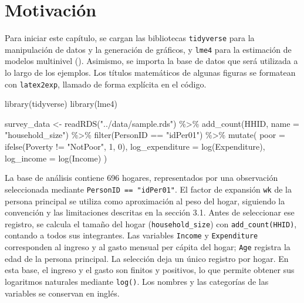 \documentclass[
  spanish,
  11pt,
  letterpaper,
  oneside,
  open=any]{scrbook}
\newenvironment{Shaded}{\begin{snugshade}}{\end{snugshade}}
\newcommand{\AttributeTok}[1]{\textcolor[rgb]{0.40,0.45,0.13}{#1}}
\newcommand{\DecValTok}[1]{\textcolor[rgb]{0.68,0.00,0.00}{#1}}
\newcommand{\FunctionTok}[1]{\textcolor[rgb]{0.28,0.35,0.67}{#1}}
\newcommand{\NormalTok}[1]{\textcolor[rgb]{0.00,0.23,0.31}{#1}}
\newcommand{\OtherTok}[1]{\textcolor[rgb]{0.00,0.23,0.31}{#1}}
\newcommand{\SpecialCharTok}[1]{\textcolor[rgb]{0.37,0.37,0.37}{#1}}
\newcommand{\StringTok}[1]{\textcolor[rgb]{0.13,0.47,0.30}{#1}}
\begin{document}
\section{Motivación}\label{sec-motivacionMult}

Para iniciar este capítulo, se cargan las bibliotecas \texttt{tidyverse}
para la manipulación de datos y la generación de gráficos, y
\texttt{lme4} para la estimación de modelos multinivel
(). Asimismo, se importa
la base de datos que será utilizada a lo largo de los ejemplos. Los
títulos matemáticos de algunas figuras se formatean con
\texttt{latex2exp}, llamado de forma explícita en el código.

\begin{Shaded}
\begin{Highlighting}[]
\FunctionTok{library}\NormalTok{(tidyverse)}
\FunctionTok{library}\NormalTok{(lme4)}

\NormalTok{survey\_data }\OtherTok{\textless{}{-}} \FunctionTok{readRDS}\NormalTok{(}\StringTok{"../data/sample.rds"}\NormalTok{) }\SpecialCharTok{\%\textgreater{}\%}
  \FunctionTok{add\_count}\NormalTok{(HHID, }\AttributeTok{name =} \StringTok{"household\_size"}\NormalTok{) }\SpecialCharTok{\%\textgreater{}\%}
  \FunctionTok{filter}\NormalTok{(PersonID }\SpecialCharTok{==} \StringTok{"idPer01"}\NormalTok{) }\SpecialCharTok{\%\textgreater{}\%}
  \FunctionTok{mutate}\NormalTok{(}
    \AttributeTok{poor =} \FunctionTok{ifelse}\NormalTok{(Poverty }\SpecialCharTok{!=} \StringTok{"NotPoor"}\NormalTok{, }\DecValTok{1}\NormalTok{, }\DecValTok{0}\NormalTok{),}
    \AttributeTok{log\_expenditure =} \FunctionTok{log}\NormalTok{(Expenditure),}
    \AttributeTok{log\_income =} \FunctionTok{log}\NormalTok{(Income)}
\NormalTok{  )}
\end{Highlighting}
\end{Shaded}

La base de análisis contiene 696 hogares, representados por una
observación seleccionada mediante \texttt{PersonID\ ==\ "idPer01"}. El
factor de expansión \texttt{wk} de la persona principal se utiliza como
aproximación al peso del hogar, siguiendo la convención y las
limitaciones descritas en la sección 3.1. Antes de seleccionar ese
registro, se calcula el tamaño del hogar (\texttt{household\_size}) con
\texttt{add\_count(HHID)}, contando a todos sus integrantes. Las
variables \texttt{Income} y \texttt{Expenditure} corresponden al ingreso
y al gasto mensual per cápita del hogar; \texttt{Age} registra la edad
de la persona principal. La selección deja un único registro por hogar.
En esta base, el ingreso y el gasto son finitos y positivos, lo que
permite obtener sus logaritmos naturales mediante \texttt{log()}. Los
nombres y las categorías de las variables se conservan en inglés.
\end{document}
